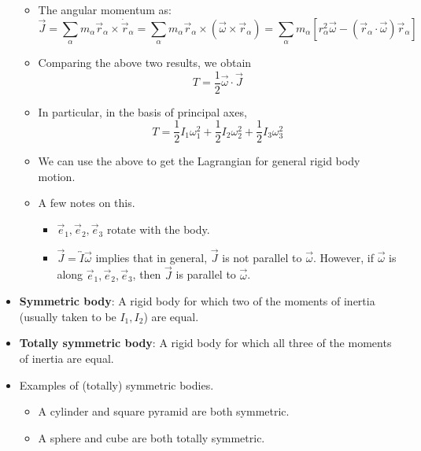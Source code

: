 \documentclass[../notes.tex]{subfiles}
\begin{document}
\begin{itemize}
\begin{itemize}
\begin{equation*}
        \end{equation*}
        \item The angular momentum as:
        \begin{equation*}
            \vec{J} = \sum_\alpha m_\alpha\vec{r}_\alpha\times\dot{\vec{r}}_\alpha
            = \sum_\alpha m_\alpha\vec{r}_\alpha\times(\vec{\omega}\times\vec{r}_\alpha)
            = \sum_\alpha m_\alpha[r_\alpha^2\vec{\omega}-(\vec{r}_\alpha\cdot\vec{\omega})\vec{r}_\alpha]
        \end{equation*}
        \item Comparing the above two results, we obtain
        \begin{equation*}
            T = \frac{1}{2}\vec{\omega}\cdot\vec{J}
        \end{equation*}
        \item In particular, in the basis of principal axes,
        \begin{equation*}
            T = \frac{1}{2}I_1\omega_1^2+\frac{1}{2}I_2\omega_2^2+\frac{1}{2}I_3\omega_3^2
        \end{equation*}
        \item We can use the above to get the Lagrangian for general rigid body motion.
        \item A few notes on this.
        \begin{itemize}
            \item $\vec{e}_1,\vec{e}_2,\vec{e}_3$ rotate with the body.
            \item $\vec{J}=\overleftrightarrow{I}\vec{\omega}$ implies that in general, $\vec{J}$ is not parallel to $\vec{\omega}$. However, if $\vec{\omega}$ is along $\vec{e}_1,\vec{e}_2,\vec{e}_3$, then $\vec{J}$ is parallel to $\vec{\omega}$.
        \end{itemize}
    \end{itemize}
    \item \textbf{Symmetric body}: A rigid body for which two of the moments of inertia (usually taken to be $I_1,I_2$) are equal.
    \item \textbf{Totally symmetric body}: A rigid body for which all three of the moments of inertia are equal.
    \item Examples of (totally) symmetric bodies.
    \begin{itemize}
        \item A cylinder and square pyramid are both symmetric.
        \item A sphere and cube are both totally symmetric.

\end{itemize}
\end{itemize}
\end{document}
